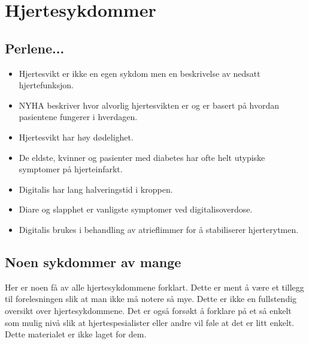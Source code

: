	\chapter{Hjertesykdommer}
		
		\section{Perlene...}
			\begin{itemize}
				\item Hjertesvikt er ikke en egen sykdom men en beskrivelse av nedsatt hjertefunksjon.\\
				\item NYHA beskriver hvor alvorlig hjertesvikten er og er basert på hvordan pasientene fungerer i hverdagen.\\
				\item Hjertesvikt har høy dødelighet.\\
				\item De eldste, kvinner og pasienter med diabetes har ofte helt utypiske symptomer på hjerteinfarkt.\\
				\item Digitalis har lang halveringstid i kroppen.\\
				\item Diare og slapphet er vanligste symptomer ved digitalisoverdose.\\
				\item Digitalis brukes i behandling av atrieflimmer for å stabiliserer hjerterytmen.\\
			\end{itemize}

		\section{Noen sykdommer av mange}	
			Her er noen få av alle hjertesykdommene forklart. Dette er ment å være et tillegg til forelesningen slik at man ikke må notere så mye. Dette er ikke en fullstendig oversikt over hjertesykdommene. Det er også forsøkt å forklare på et så enkelt som mulig nivå slik at hjertespesialister eller andre vil føle at det er litt enkelt. Dette materialet er ikke laget for dem.\\
